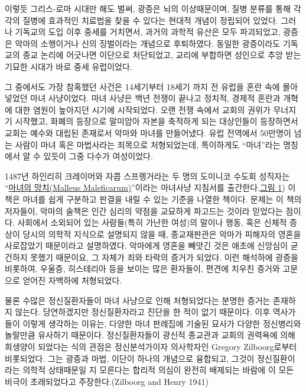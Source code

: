 \documentclass[
]{article}
\begin{document}
이렇듯 그리스-로마 시대만 해도 벌써, 광증은 뇌의 이상때문이며, 질병
분류를 통해 각각의 질병에 효과적인 치료법을 찾을 수 있다는 현대적 개념이
정립되어 있었다. 그러나 기독교의 도입 이후 중세를 거치면서, 과거의
과학적 유산은 모두 파괴되었고, 광증은 악마의 소행이거나 신의 징벌이라는
개념으로 후퇴하였다. 동일한 광증이라도 기독교의 종교 논리에 어긋나면
이단으로 처단되었고, 교리에 부합하면 성인으로 추앙 받는 기묘한 시대가
바로 중세 유럽이었다.

그 중에서도 가장 참혹했던 사건은 14세기부터 18세기 까지 전 유럽을 혼란
속에 몰아넣었던 마녀 사냥이었다. 마녀 사냥은 백년 전쟁이 끝나고 정치적,
경제적 혼란과 개혁에 대한 염원이 높아지던 시기에 시작되었다. 오랜 전쟁
속에서 교회의 권위가 무너지기 시작했고, 화폐의 등장으로 말미암아 자본을
축적하게 되는 대상인들이 등장하면서 교회는 예수와 대립된 존재로서 악마와
마녀를 만들어냈다. 유럽 전역에서 50만명이 넘는 사람이 마녀 혹은
마법사라는 죄목으로 처형되었는데, 특이하게도 ``마녀''라는 명칭에서 알 수
있듯이 그중 다수가 여성이었다.

1487년 하인리히 크레이머와 자콥 스프렝거라는 두 명의 도미니코 수도회
성직자는
``\href{https://en.wikipedia.org/wiki/Malleus_Maleficarum}{마녀의
망치(Malleus Maleficarum)}''이라는 마녀사냥 지침서를
출간한다.\protect\hyperlink{fig:malleus}{그림 1}) 이 책은 마녀를 쉽게
구분하고 판결을 내릴 수 있는 기준을 나열한 책이다. 문제는 이 책의
저자들이, 악마의 술책은 인간 심리의 약점을 교묘하게 파고드는 것이라
믿었다는 점이다. 사회에서 소외되어 있는 사람들(특히 가난한 여성)의
말이나 행동, 혹은 신체적 증상이 당시의 의학적 지식으로 설명되지 않을 때,
종교재판관은 악마가 피해자의 영혼을 사로잡았기 때문이라고 설명하였다.
악마에게 영혼을 빼앗긴 것은 애초에 신앙심이 굳건하지 못했기 때문이요, 그
자체가 죄와 타락의 증거가 되었다. 이런 해석하에 광증을 비롯하여, 우울증,
히스테리아 등을 보이는 많은 환자들이, 편견에 치우친 증거와 고문으로
얻어진 자백하에 처형되었다.

물론 수많은 정신질환자들이 마녀 사냥으로 인해 처형되었다는 분명한 증거는
존재하지 않는다. 당연하겠지만 정신질환자라고 진단을 한 적이 없기
때문이다. 이후 역사가들이 이렇게 생각하는 이유는, 다양한 마녀 판례집에
기술된 묘사가 다양한 정신병리와 놀랄만큼 유사하기 때문이다.
정신질환자들이 광신적 종교관과 교회의 권력욕에 의해 희생양이 되었다는
식의 관점은 정신분석가이자 의사학자인 Gregory Zilboorg로부터 비롯되었다.
그는 광증과 마법, 이단이 하나의 개념으로 융합되고, 그것이 정신질환이라는
의학적 상태때문일 지 모른다는 합리적 의심이 완전히 배제되는 바람에 이
모든 비극이 초래되었다고 주장한다.(Zilboorg and Henry 1941)
\end{document}
